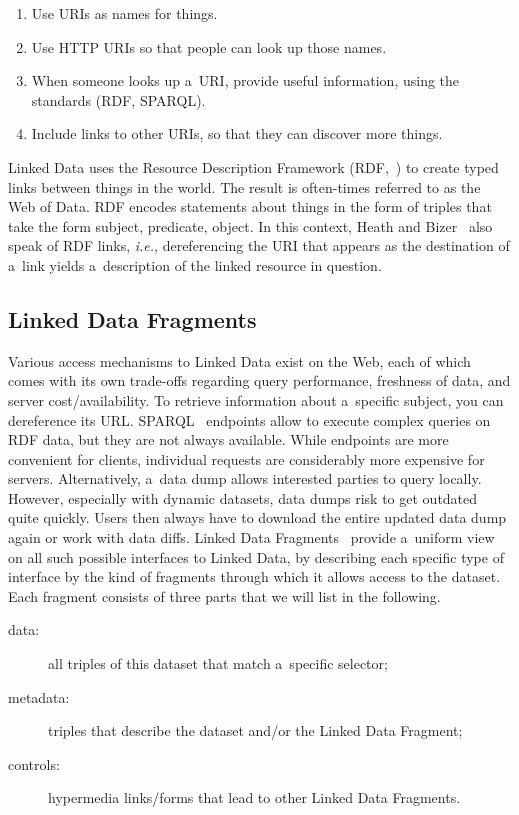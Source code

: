 \documentclass[runningheads,a4paper]{llncs}
\begin{document}
\begin{enumerate}
	\item Use URIs as names for things.
	\item Use HTTP URIs so that people can look up those names.
	\item When someone looks up a~URI, provide useful information, using the standards (RDF, SPARQL).
	\item Include links to other URIs, so that they can discover more things.
\end{enumerate}

Linked Data uses the Resource Description Framework (RDF,~\cite{klyne2004rdf})
to create typed links between things in the world.
The result is often-times referred to as the Web of Data.
RDF encodes statements about things in the form of triples that take the form subject, predicate, object. 
In this context, Heath and Bizer~\cite{bizer2009linkeddatastory} also speak of RDF links,
\emph{i.e.}, dereferencing the URI that appears as the destination of a~link
yields a~description of the linked resource in question.

\subsection{Linked Data Fragments}
Various access mechanisms to Linked Data exist on the Web,
each of which comes with its own trade-offs regarding query performance, freshness of data,
and server cost/availability.
To retrieve information about a~specific subject, you can dereference its URL.
SPARQL~\cite{prudhommeaux2008sparql} endpoints allow to execute complex queries on RDF data,
but they are not always available.
While endpoints are more convenient for clients, individual requests
are considerably more expensive for servers.
Alternatively, a~data dump allows interested parties to query locally.
However, especially with dynamic datasets, data dumps risk to get outdated quite quickly.
Users then always have to download the entire updated data dump again
or work with data diffs.
Linked Data Fragments~\cite{verborgh2014ldf} provide a~uniform view
on all such possible interfaces to Linked Data,
by describing each specific type of interface by the kind of fragments through which
it allows access to the dataset.
Each fragment consists of three parts that we will list in the following.

\begin{description}
	\item[data:] all triples of this dataset that match a~specific selector;
	\item[metadata:] triples that describe the dataset and/or the Linked Data Fragment;
	\item[controls:] hypermedia links/forms that lead to other Linked Data Fragments.
\end{description}
\end{document}
